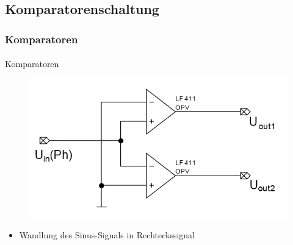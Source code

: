 \subsection{Komparatorenschaltung} %
\label{sub:Komparatorenschaltung}
\begin{frame}
\frametitle{Komparatoren}
\framesubtitle{}
    \begin{block}{Komparatoren}
        \begin{figure}[H]
        \begin{center}
                \includegraphics[scale=0.5]{./img/schaltung/Komparatoren.png}
        \end{center}
        \end{figure}
         \begin{itemize}
             \item Wandlung des Sinus-Signals in Rechteckssignal
         \end{itemize}
    \end{block}
\end{frame}

